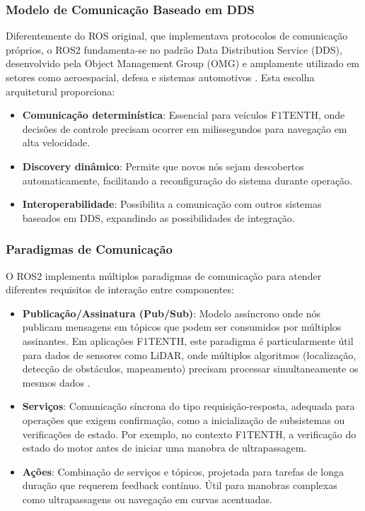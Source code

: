 \subsubsection{Modelo de Comunicação Baseado em DDS}

Diferentemente do ROS original, que implementava protocolos de comunicação
próprios, o ROS2 fundamenta-se no padrão Data Distribution Service (DDS),
desenvolvido pela Object Management Group (OMG) e amplamente utilizado em
setores como aeroespacial, defesa e sistemas automotivos
\cite{maruyama2016exploring}. Esta escolha arquitetural proporciona:

\begin{itemize}
    \item \textbf{Comunicação determinística}: Essencial para veículos F1TENTH, onde decisões de controle precisam ocorrer em milissegundos para navegação em alta velocidade.
    \item \textbf{Discovery dinâmico}: Permite que novos nós sejam descobertos automaticamente, facilitando a reconfiguração do sistema durante operação.
    \item \textbf{Interoperabilidade}: Possibilita a comunicação com outros sistemas baseados em DDS, expandindo as possibilidades de integração.
\end{itemize}

\subsubsection{Paradigmas de Comunicação}

O ROS2 implementa múltiplos paradigmas de comunicação para atender diferentes
requisitos de interação entre componentes:

\begin{itemize}
    \item \textbf{Publicação/Assinatura (Pub/Sub)}: Modelo assíncrono onde nós publicam mensagens em tópicos que podem ser consumidos por múltiplos assinantes. Em aplicações F1TENTH, este paradigma é particularmente útil para dados de sensores como LiDAR, onde múltiplos algoritmos (localização, detecção de obstáculos, mapeamento) precisam processar simultaneamente os mesmos dados \cite{staranowicz2013survey}.
    \item \textbf{Serviços}: Comunicação síncrona do tipo requisição-resposta, adequada para operações que exigem confirmação, como a inicialização de subsistemas ou verificações de estado. Por exemplo, no contexto F1TENTH, a verificação do estado do motor antes de iniciar uma manobra de ultrapassagem.
    \item \textbf{Ações}: Combinação de serviços e tópicos, projetada para tarefas de longa duração que requerem feedback contínuo. Útil para manobras complexas como ultrapassagens ou navegação em curvas acentuadas.
\end{itemize}

